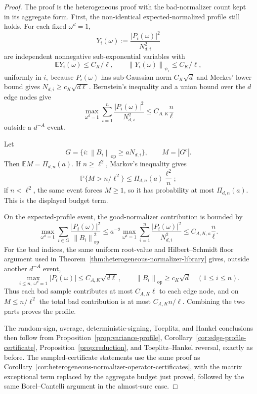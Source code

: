 \documentclass[11pt]{amsart}
\numberwithin{equation}{section}
\theoremstyle{definition}
\theoremstyle{remark}
\newcommand{\op}{\mathrm{op}}
\newcommand{\Prob}{\mathbb P}
\newcommand{\Exp}{\mathbb E}
\newcommand{\norm}[1]{\left\lVert #1\right\rVert}
\newcommand{\abs}[1]{\left\lvert #1\right\rvert}
\begin{document}
\begin{proof}
The proof is the heterogeneous proof with the bad-normalizer count kept in its
aggregate form.  First, the non-identical expected-normalized profile still
holds.  For each fixed \(\omega^d=1\),
\[
  Y_i(\omega):=\frac{\abs{P_i(\omega)}^2}{N_{d,i}^2}
\]
are independent nonnegative sub-exponential variables with
\[
  \Exp Y_i(\omega)\le C_K/\ell,\qquad
  \norm{Y_i(\omega)}_{\psi_1}\le C_K/\ell,
\]
uniformly in \(i\), because \(P_i(\omega)\) has sub-Gaussian norm
\(C_K\sqrt d\) and Meckes' lower bound gives
\(N_{d,i}\ge c_K\sqrt{d\ell}\).  Bernstein's inequality and a union bound over
the \(d\) edge nodes give
\[
  \max_{\omega^d=1}\sum_{i=1}^n
  \frac{\abs{P_i(\omega)}^2}{N_{d,i}^2}
  \le C_{A,K}\frac n\ell
\]
outside a \(d^{-A}\) event.

Let
\[
  G=\{i:\norm{B_i}_{\op}\ge aN_{d,i}\},\qquad M=\abs{G^c}.
\]
Then \(\Exp M=\Pi_{d,n}(a)\).  If \(n\ge\ell^2\), Markov's inequality gives
\[
  \Prob\{M>n/\ell^2\}\le \Pi_{d,n}(a)\frac{\ell^2}{n};
\]
if \(n<\ell^2\), the same event forces \(M\ge1\), so it has probability at most
\(\Pi_{d,n}(a)\).  This is the displayed budget term.

On the expected-profile event, the good-normalizer contribution is bounded by
\[
  \max_{\omega^d=1}\sum_{i\in G}
  \frac{\abs{P_i(\omega)}^2}{\norm{B_i}_{\op}^2}
  \le
  a^{-2}
  \max_{\omega^d=1}\sum_{i=1}^n
  \frac{\abs{P_i(\omega)}^2}{N_{d,i}^2}
  \le C_{A,K,a}\frac n\ell .
\]
For the bad indices, the same uniform root-value and Hilbert--Schmidt floor
argument used in Theorem~\ref{thm:heterogeneous-normalizer-library} gives,
outside another \(d^{-A}\) event,
\[
  \max_{i\le n,\ \omega^d=1}\abs{P_i(\omega)}
  \le C_{A,K}\sqrt{d\ell},
  \qquad
  \norm{B_i}_{\op}\ge c_K\sqrt d
  \quad(1\le i\le n).
\]
Thus each bad sample contributes at most \(C_{A,K}\ell\) to each edge node, and
on \(M\le n/\ell^2\) the total bad contribution is at most \(C_{A,K}n/\ell\).
Combining the two parts proves the profile.

The random-sign, average, deterministic-signing, Toeplitz, and Hankel
conclusions then follow from Proposition~\ref{prop:variance-profile},
Corollary~\ref{cor:edge-profile-certificate}, Proposition~\ref{prop:reduction},
and Toeplitz--Hankel reversal, exactly as before.  The sampled-certificate
statements use the same proof as
Corollary~\ref{cor:heterogeneous-normalizer-operator-certificates}, with the
matrix exceptional term replaced by the aggregate budget just proved, followed
by the same Borel--Cantelli argument in the almost-sure case.
\end{proof}
\end{document}
